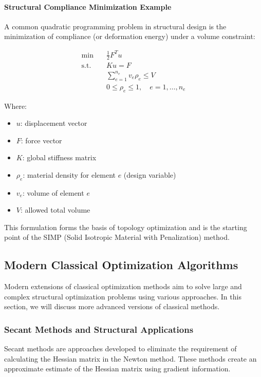 \paragraph{Structural Compliance Minimization Example}
A common quadratic programming problem in structural design is the minimization of compliance (or deformation energy) under a volume constraint:

\begin{equation}
\begin{aligned}
\min & \quad \frac{1}{2}F^Tu \\
\text{s.t.} & \quad Ku = F \\
& \quad \sum_{e=1}^{n_e} v_e\rho_e \leq V \\
& \quad 0 \leq \rho_e \leq 1, \quad e = 1, \ldots, n_e
\end{aligned}
\end{equation}

Where:
\begin{itemize}
    \item $u$: displacement vector
    \item $F$: force vector
    \item $K$: global stiffness matrix
    \item $\rho_e$: material density for element $e$ (design variable)
    \item $v_e$: volume of element $e$
    \item $V$: allowed total volume
\end{itemize}

This formulation forms the basis of topology optimization and is the starting point of the SIMP (Solid Isotropic Material with Penalization) method.

\subsection{Modern Classical Optimization Algorithms}

Modern extensions of classical optimization methods aim to solve large and complex structural optimization problems using various approaches. In this section, we will discuss more advanced versions of classical methods.

\subsubsection{Secant Methods and Structural Applications}

Secant methods are approaches developed to eliminate the requirement of calculating the Hessian matrix in the Newton method. These methods create an approximate estimate of the Hessian matrix using gradient information.


